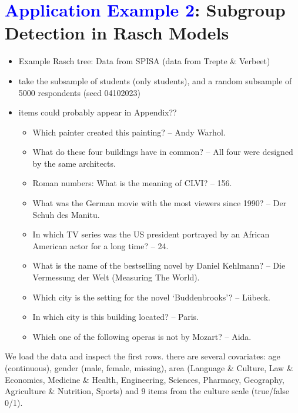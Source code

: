 \documentclass[doc,floatsintext,natbib]{apa7}
\newcommand{\edc}[1]{\textcolor{blue}{#1}}
\begin{document}
\section{\edc{Application Example 2}: Subgroup Detection in Rasch Models}
\label{sec:TutorialRasch}

\begin{itemize}
\item Example Rasch tree: Data from SPISA (data from Trepte \& Verbeet)
\item take the subsample of students (only students), and a random subsample of 5000 respondents (seed 04102023)
\item items could probably appear in Appendix??
\begin{itemize}
\item Which painter created this painting? – Andy Warhol.
\item What do these four buildings have in common? – All four were designed by the same architects.
\item Roman numbers: What is the meaning of CLVI? – 156.
\item What was the German movie with the most viewers since 1990? – Der Schuh des Manitu.
\item In which TV series was the US president portrayed by an African American actor for a long time? – 24.
\item What is the name of the bestselling novel by Daniel Kehlmann? – Die Vermessung der Welt (Measuring The World).
\item Which city is the setting for the novel ‘Buddenbrooks’? – Lübeck.
\item In which city is this building located? – Paris.
\item Which one of the following operas is not by Mozart? – Aida.
\end{itemize}
\end{itemize}


We load the data and inspect the first rows. there are several covariates: age (continuous), gender (male, female, missing), area (Language \& Culture, Law \& Economics, Medicine \& Health, Engineering, Sciences, Pharmacy, Geography, Agriculture \& Nutrition, Sports) and 9 items from the culture scale (true/false 0/1). 
\end{document}
